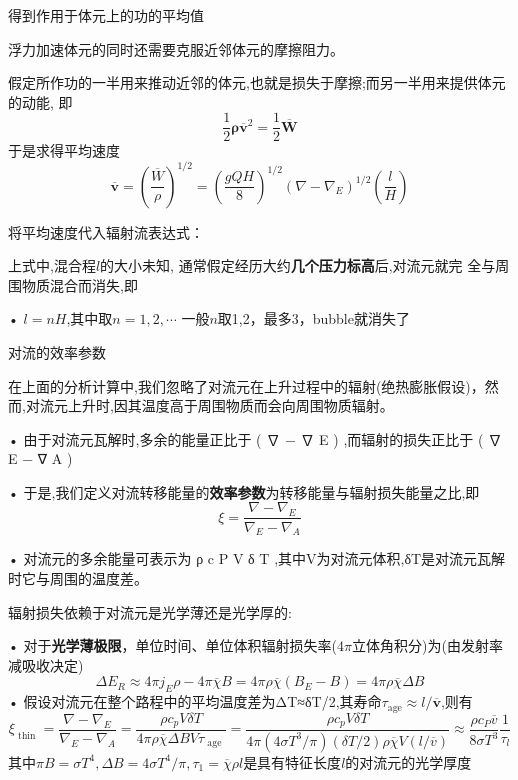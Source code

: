 \documentclass[UTF8]{article}
\begin{document}
\begin{fangsong}
得到作用于体元上的功的平均值

浮力加速体元的同时还需要克服近邻体元的摩擦阻力。

假定所作功的一半用来推动近邻的体元,也就是损失于摩擦;而另一半用来提供体元的动能,
即$$\frac { 1 } { 2 } \boldsymbol { \rho } \overline { \mathbf { v } } ^ { 2 } = \frac { 1 } { 2 } \overline { \boldsymbol { W } }$$
于是求得平均速度
$$\overline { \mathbf { v } } = \left( \frac { \overline { W } } { \rho } \right) ^ { 1 / 2 } = \left( \frac { g Q H } { 8 } \right) ^ { 1 / 2 } \left( \nabla - \nabla _ { E } \right) ^ { 1 / 2 } \left( \frac { l } { H } \right)$$

将平均速度代入辐射流表达式：

上式中,混合程$ l$的大小未知, 通常假定经历大约\textbf{几个压力标高}后,对流元就完
全与周围物质混合而消失,即

• $l = n H$,其中取$n=1, 2,\cdots$
一般$n$取1,2，最多3，bubble就消失了

\noindent 对流的效率参数

在上面的分析计算中,我们忽略了对流元在上升过程中的辐射(绝热膨胀假设)，然而,对流元上升时,因其温度高于周围物质而会向周围物质辐射。

• 由于对流元瓦解时,多余的能量正比于 ( ∇ − ∇ E ) ,而辐射的损失正比于 ( ∇ E − ∇ A )

• 于是,我们定义对流转移能量的\textbf{效率参数}为转移能量与辐射损失能量之比,即
$$\xi = \frac { \nabla - \nabla _ { E } } { \nabla _ { E } - \nabla _ { A } }$$

• 对流元的多余能量可表示为 ρ c P V δ T ,其中V为对流元体积,δT是对流元瓦解
时它与周围的温度差。

辐射损失依赖于对流元是光学薄还是光学厚的:

• 对于\textbf{光学薄极限}，单位时间、单位体积辐射损失率($4\pi$立体角积分)为(由发射率减吸收决定)
$$\Delta E _ { R } \approx 4 \pi j _ { E } \rho - 4 \pi \overline { \chi } B = 4 \pi \rho \overline { \chi } \left( B _ { E } - B \right) = 4 \pi \rho \overline { \chi } \Delta B$$
• 假设对流元在整个路程中的平均温度差为ΔT≈δT/2,其寿命$\tau _ { \mathrm { age } } \approx l / \overline { \mathbf { v } }$,则有
$$\xi _ { \text { thin } } = \frac { \nabla - \nabla _ { E } } { \nabla _ { E } - \nabla _ { A } } = \frac { \rho c _ { p } V \delta T } { 4 \pi \rho \overline { \chi } \Delta B V \tau _ { \text { age } } } = \frac { \rho c _ { p } V \delta T } { 4 \pi \left( 4 \sigma T ^ { 3 } / \pi \right) ( \delta T / 2 ) \rho \overline { \chi } V ( l / \overline { v } ) } \approx \frac { \rho c _ { P } \overline { v } } { 8 \sigma T ^ { 3 } } \frac { 1 } { \tau _ { l } }$$
其中$\pi B=\sigma T^4,\Delta B=4\sigma T^4/\pi,\tau _ { 1 } = \overline { \chi } \rho l$是具有特征长度$l$的对流元的光学厚度


\end{fangsong}
\end{document}
